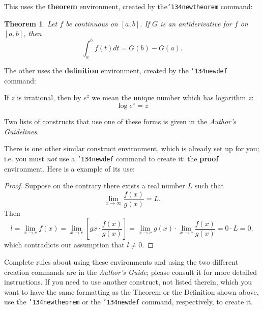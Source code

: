 \documentclass{sig-alternate-05-2015}
\begin{document}
This uses the \textbf{theorem} environment, created by
the\linebreak\texttt{{\char'134}newtheorem} command:
\newtheorem{theorem}{Theorem}
\begin{theorem}
Let $f$ be continuous on $[a,b]$.  If $G$ is
an antiderivative for $f$ on $[a,b]$, then
\begin{displaymath}\int^b_af(t)dt = G(b) - G(a).\end{displaymath}
\end{theorem}

The other uses the \textbf{definition} environment, created
by the \texttt{{\char'134}newdef} command:
\begin{definition}
If $z$ is irrational, then by $e^z$ we mean the
unique number which has
logarithm $z$: \begin{displaymath}{\log e^z = z}\end{displaymath}
\end{definition}

Two lists of constructs that use one of these
forms is given in the
\textit{Author's  Guidelines}.

There is one other similar construct environment, which is
already set up
for you; i.e. you must \textit{not} use
a \texttt{{\char'134}newdef} command to
create it: the \textbf{proof} environment.  Here
is a example of its use:
\begin{proof}
Suppose on the contrary there exists a real number $L$ such that
\begin{displaymath}
\lim_{x\rightarrow\infty} \frac{f(x)}{g(x)} = L.
\end{displaymath}
Then
\begin{displaymath}
l=\lim_{x\rightarrow c} f(x)
= \lim_{x\rightarrow c}
\left[ g{x} \cdot \frac{f(x)}{g(x)} \right ]
= \lim_{x\rightarrow c} g(x) \cdot \lim_{x\rightarrow c}
\frac{f(x)}{g(x)} = 0\cdot L = 0,
\end{displaymath}
which contradicts our assumption that $l\neq 0$.
\end{proof}

Complete rules about using these environments and using the
two different creation commands are in the
\textit{Author's Guide}; please consult it for more
detailed instructions.  If you need to use another construct,
not listed therein, which you want to have the same
formatting as the Theorem
or the Definition\cite{salas:calculus} shown above,
use the \texttt{{\char'134}newtheorem} or the
\texttt{{\char'134}newdef} command,
respectively, to create it.




\end{document}
